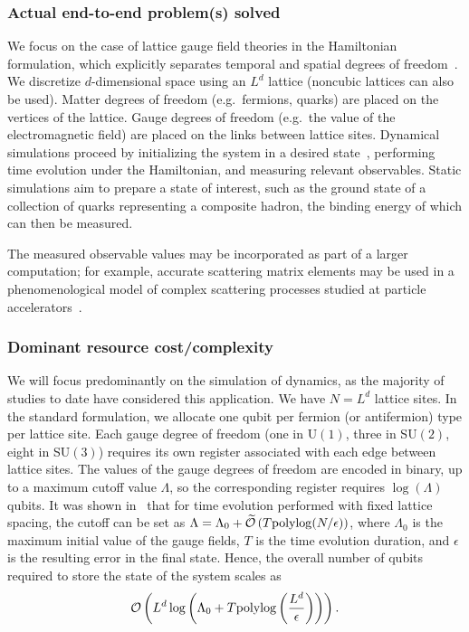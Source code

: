\begin{refsection}
\subsubsection*{Actual end-to-end problem(s) solved}
We focus on the case of lattice gauge field theories in the Hamiltonian formulation, which explicitly separates temporal and spatial degrees of freedom~\cite{kogut1979LatticeGaugeTheory}. We discretize $d$-dimensional space using an $L^d$ lattice (noncubic lattices can also be used). Matter degrees of freedom (e.g.~fermions, quarks) are placed on the vertices of the lattice. Gauge degrees of freedom (e.g.~the value of the electromagnetic field) are placed on the links between lattice sites. Dynamical simulations proceed by initializing the system in a desired state~\cite{bagherimehrab2022InitialStatePrepQFT}, performing time evolution under the Hamiltonian, and measuring relevant observables. Static simulations aim to prepare a state of interest, such as the ground state of a collection of quarks representing a composite hadron, the binding energy of which can then be measured.

The measured observable values may be incorporated as part of a larger computation; for example, accurate scattering matrix elements may be used in a phenomenological model of complex scattering processes studied at particle accelerators~\cite{gehrmann2022QCDatLHCapprox}.



\subsubsection*{Dominant resource cost/complexity}
We will focus predominantly on the simulation of dynamics, as the majority of studies to date have considered this application. We have $N=L^d$ lattice sites. In the standard formulation, we allocate one qubit per fermion (or antifermion) type per lattice site. Each gauge degree of freedom (one in U$(1)$, three in SU$(2)$, eight in SU$(3)$) requires its own register associated with each edge between lattice sites. The values of the gauge degrees of freedom are encoded in binary, up to a maximum cutoff value $\Lambda$, so the corresponding register requires $\log(\Lambda)$ qubits. It was shown in~\cite{tong2021ProvablyAccurateGaugeTheoryBosonicSystems} that for time evolution performed with fixed lattice spacing, the cutoff can be set as $\Lambda = \Lambda_0 + \widetilde{\mathcal{O}}\left( T \mathrm{polylog}(N/\epsilon) \right)$, where $\Lambda_0$ is the maximum initial value of the gauge fields, $T$ is the time evolution duration, and $\epsilon$ is the resulting error in the final state. Hence, the overall number of qubits required to store the state of the system scales as
\begin{equation}
    \mathcal{O}\left( L^d \log\left( \Lambda_0 + T \mathrm{polylog}\left(\frac{L^d}{\epsilon} \right) \right) \right).
\end{equation}


\end{refsection}
